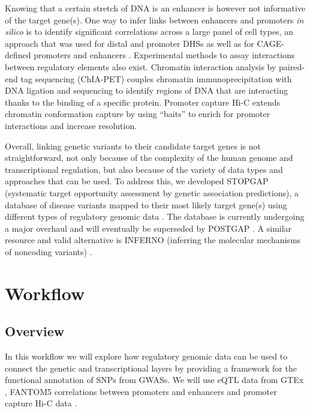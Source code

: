 \documentclass[9pt,a4paper,]{extarticle}
\begin{document}
Knowing that a certain stretch of DNA is an enhancer is however not informative of the target gene(s).
One way to infer links between enhancers and promoters \emph{in silico} is to identify significant correlations across a large panel of cell types, an approach that was used for distal and promoter DHSs \citep{Thurman2012} as well as for CAGE-defined promoters and enhancers \citep{Andersson2014}.
Experimental methods to assay interactions between regulatory elements also exist.
Chromatin interaction analysis by paired-end tag sequencing (ChIA-PET) \citep{Fullwood2009, Zhang2013} couples chromatin immunoprecipitation with DNA ligation and sequencing to identify regions of DNA that are interacting thanks to the binding of a specific protein.
Promoter capture Hi-C \citep{Mifsud2015, Javierre2016} extends chromatin conformation capture by using ``baits'' to enrich for promoter interactions and increase resolution.

Overall, linking genetic variants to their candidate target genes is not straightforward, not only because of the complexity of the human genome and transcriptional regulation, but also because of the variety of data types and approaches that can be used.
To address this, we developed STOPGAP (systematic target opportunity assessment by genetic association predictions), a database of disease variants mapped to their most likely target gene(s) using different types of regulatory genomic data \citep{Shen2017}.
The database is currently undergoing a major overhaul and will eventually be superseded by POSTGAP \citep{Ensembl2017}.
A similar resource and valid alternative is INFERNO (inferring the molecular mechanisms of noncoding variants) \citep{Amlie-Wolf2017}.

\section{Workflow}\label{workflow}

\subsection{Overview}\label{overview}

In this workflow we will explore how regulatory genomic data can be used to connect the genetic and transcriptional layers by providing a framework for the functional annotation of SNPs from GWASs.
We will use eQTL data from GTEx \citep{GTEx2017a}, FANTOM5 correlations between promoters and enhancers \citep{Andersson2014} and promoter capture Hi-C data \citep{Javierre2016}.
\end{document}
